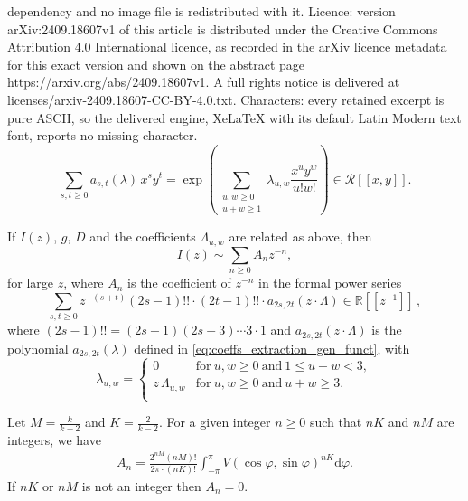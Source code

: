 \documentclass[10pt,a4paper]{amsart}
\newcommand{\R}{\mathbb{R}}
\newcommand{\dd}{\mathrm{d}}
\newcommand{\ol}{\Lambda}
\begin{document}
dependency and no image file is redistributed with it. Licence: version arXiv:2409.18607v1 of this article is distributed under the Creative Commons Attribution 4.0 International licence, as recorded in the arXiv licence metadata for this exact version and shown on the abstract page https://arxiv.org/abs/2409.18607v1. A full rights notice is delivered at licenses/arxiv-2409.18607-CC-BY-4.0.txt. Characters: every retained excerpt is pure ASCII, so the delivered engine, XeLaTeX with its default Latin Modern text font, reports no missing character.
\begin{equation}
\label{eq:coeffs_extraction_gen_funct}
    \sum_{s,t \geq 0} a_{s,t}(\lambda)\, x^s y^t =
\exp\left(\sum_{\substack{u,w \geq 0\\u+w \geq 1}} \lambda_{u,w} \frac{x^u y^w}{u!w!}\right) \in \mathcal R[[x,y]].
\end{equation}

\begin{proposition}
\label{prop:laplace}
If $I(z)$, $g$, $D$ and the coefficients $\ol_{u,w}$ are related as above, then
\[
I(z) \sim \sum_{n\geq 0} A_n z^{-n},
\]
for large $z$, where $A_n$ is the coefficient of $z^{-n}$ in the formal power series
\[
    \sum_{s,t\geq 0} z^{-(s+t)} (2s-1)!! \cdot (2t-1)!! \cdot a_{2s,2t} (z \cdot \ol) \in \R[[z^{-1}]]\,,
\]
where $(2s-1)!! = (2s-1)(2s-3)\cdots 3\cdot 1$ and $a_{2s,2t} (z \cdot \ol)$ is the polynomial $a_{2s,2t}(\lambda)$ defined in \eqref{eq:coeffs_extraction_gen_funct},
with 
\begin{equation}
    \label{eq:substitution_lambda_Lambda}
    \lambda_{u,w} = \left\{ \begin{array}{ll}
        0 & \text{for}~ u,w\geq 0 ~\text{and}~ 1 \leq u+w < 3, \\
        z\,\Lambda_{u,w} & \text{for}~ u,w\geq 0 ~\text{and}~ u+w \geq 3 .\\
    \end{array} \right.
\end{equation}
\end{proposition}

\begin{lemma}
\label{lmm:AnHomo}
Let $M = \frac{k}{k-2}$ and $K=\frac{2}{k-2}$.
For a given integer $n \geq 0$ such that $nK$ and $nM$ are integers, we have
\begin{gather*}
A_n = \frac{2^{nM} (nM)! }{ 2\pi \cdot (nK)!} 
\int_{-\pi}^\pi  V(\cos\varphi ,\sin \varphi)^{nK} \dd \varphi.
\end{gather*}
If $nK$ or $nM$ is not an integer then $A_n =0$.
\end{lemma}
\end{document}
